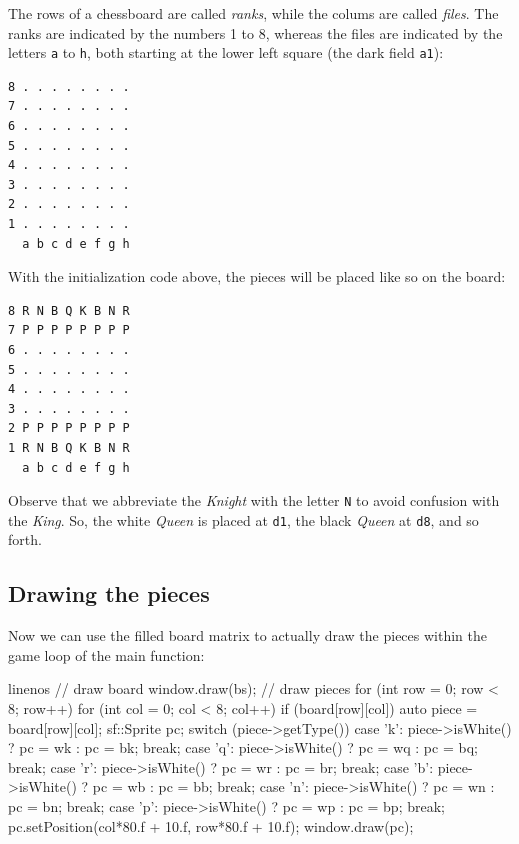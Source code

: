 The rows of a chessboard are called \emph{ranks}, while the colums are called
\emph{files}.
The ranks are indicated by the numbers 1 to 8, whereas the files are indicated by the letters
\texttt{a} to \texttt{h}, both starting at the lower left square (the dark field \texttt{a1}):
\begin{samepage}
\begin{verbatim}
8 . . . . . . . .
7 . . . . . . . .
6 . . . . . . . .
5 . . . . . . . .
4 . . . . . . . .
3 . . . . . . . .
2 . . . . . . . .
1 . . . . . . . .
  a b c d e f g h
\end{verbatim}

With the initialization code above, the pieces will be placed like so on the board:

\begin{verbatim}
8 R N B Q K B N R
7 P P P P P P P P
6 . . . . . . . .
5 . . . . . . . .
4 . . . . . . . .
3 . . . . . . . .
2 P P P P P P P P
1 R N B Q K B N R
  a b c d e f g h
\end{verbatim}
\end{samepage}

Observe that we abbreviate the \emph{Knight} with the letter \texttt{N} to avoid confusion with
the \emph{King}.
So, the white \emph{Queen} is placed at \texttt{d1}, the black \emph{Queen} at \texttt{d8},
and so forth.

\subsection{Drawing the pieces}
Now we can use the filled board matrix to actually draw the pieces within the game loop of the
main function:

\begin{cpp*}{linenos}
    // draw board
    window.draw(bs);
    // draw pieces
    for (int row = 0; row < 8; row++) {
      for (int col = 0; col < 8; col++) {
        if (board[row][col]) {
          auto piece = board[row][col];
          sf::Sprite pc;
          switch (piece->getType()) {
          case 'k':
            piece->isWhite() ? pc = wk : pc = bk;
            break;
          case 'q':
            piece->isWhite() ? pc = wq : pc = bq;
            break;
          case 'r':
            piece->isWhite() ? pc = wr : pc = br;
            break;
          case 'b':
            piece->isWhite() ? pc = wb : pc = bb;
            break;
          case 'n':
            piece->isWhite() ? pc = wn : pc = bn;
            break;
          case 'p':
            piece->isWhite() ? pc = wp : pc = bp;
            break;
          }
          pc.setPosition(col*80.f + 10.f, row*80.f + 10.f);
          window.draw(pc);
        }
      }
    }
\end{cpp*}

